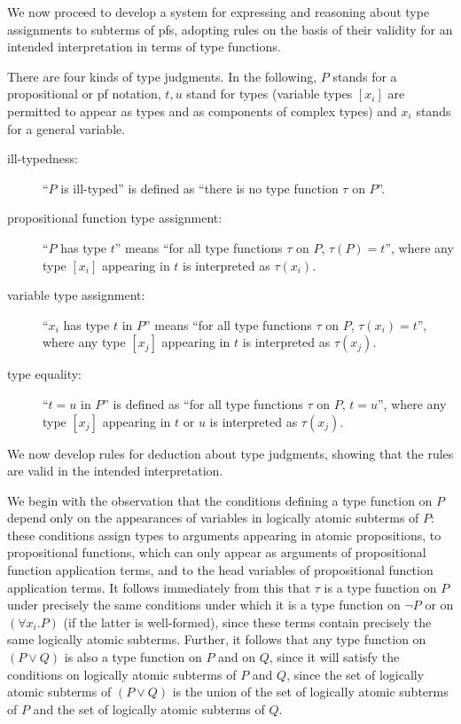 \documentclass{article}
\begin{document}
We now proceed to develop a system for expressing and reasoning about
type assignments to subterms of pfs, adopting rules on the basis of
their validity for an intended interpretation in terms of type
functions.

There are four kinds of type judgments.  In the following, $P$ stands
for a propositional or pf notation, $t, u$ stand for types (variable
types $[x_i]$ are permitted to appear as types and as components of
complex types) and $x_i$ stands for a general variable.

\begin{description}

\item[ill-typedness:] ``$P$ is ill-typed'' is defined as ``there is no
type function $\tau$ on $P$''.

\item[propositional function type assignment:]  ``$P$ has type $t$'' means
``for all type functions $\tau$ on $P$, $\tau(P) = t$'', where any type $[x_i]$
appearing in $t$ is interpreted as $\tau(x_i)$.

\item[variable type assignment:] ``$x_i$ has type $t$ in $P$'' means ``for all
type functions $\tau$ on $P$, $\tau(x_i) = t$'', where any type
$[x_j]$ appearing in $t$ is interpreted as $\tau(x_j)$.

\item[type equality:] ``$t=u$ in $P$'' is defined as ``for all type
functions $\tau$ on $P$, $t=u$'', where any type $[x_j]$ appearing in
$t$ or $u$ is interpreted as $\tau(x_j)$.

\end{description}

We now develop rules for deduction about type judgments, showing that the rules are
valid in the intended interpretation.

We begin with the observation that the conditions defining a type
function on $P$ depend only on the appearances of variables in
logically atomic subterms of $P$: these conditions assign types to
arguments appearing in atomic propositions, to propositional
functions, which can only appear as arguments of propositional
function application terms, and to the head variables of propositional
function application terms.  It follows immediately from this that
$\tau$ is a type function on $P$ under precisely the same conditions
under which it is a type function on $\neg P$ or on $(\forall x_i.P)$
(if the latter is well-formed), since these terms contain precisely
the same logically atomic subterms.  Further, it follows that any type
function on $(P \vee Q)$ is also a type function on $P$ and on $Q$,
since it will satisfy the conditions on logically atomic subterms of
$P$ and $Q$, since the set of logically atomic subterms of $(P \vee
Q)$ is the union of the set of logically atomic subterms of $P$ and
the set of logically atomic subterms of $Q$.
\end{document}
